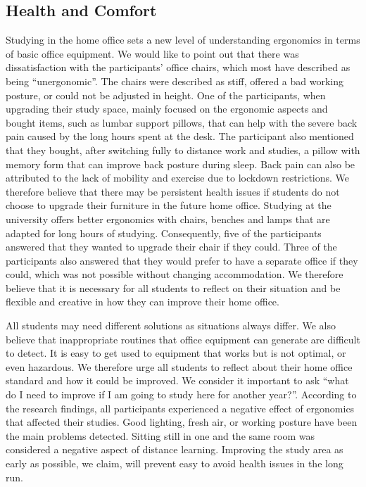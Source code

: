 \documentclass{sigchi}
\begin{document}
\subsection{Health and Comfort}
Studying in the home office sets a new level of understanding ergonomics in terms of basic office equipment. We would like to point out that there was dissatisfaction with the participants' office chairs, which most have described as being ``unergonomic''. The chairs were described as stiff, offered a bad working posture, or could not be adjusted in height. One of the participants, when upgrading their study space, mainly focused on the ergonomic aspects and bought items, such as lumbar support pillows, that can help with the severe back pain caused by the long hours spent at the desk. The participant also mentioned that they bought, after switching fully to distance work and studies, a pillow with memory form that can improve back posture during sleep. Back pain can also be attributed to the lack of mobility and exercise due to lockdown restrictions. We therefore believe that there may be persistent health issues if students do not choose to upgrade their furniture in the future home office. Studying at the university offers better ergonomics with chairs, benches and lamps that are adapted for long hours of studying. Consequently, five of the participants answered that they wanted to upgrade their chair if they could. Three of the participants also answered that they would prefer to have a separate office if they could, which was not possible without changing accommodation. We therefore believe that it is necessary for all students to reflect on their situation and be flexible and creative in how they can improve their home office. 

All students may need different solutions as situations always differ. We also believe that inappropriate routines that office equipment can generate are difficult to detect. It is easy to get used to equipment that works but is not optimal, or even hazardous. We therefore urge all students to reflect about their home office standard and how it could be improved. We consider it important to ask ``what do I need to improve if I am going to study here for another year?''. According to the research findings, all participants experienced a negative effect of ergonomics that affected their studies. Good lighting, fresh air, or working posture have been the main problems detected. Sitting still in one and the same room was considered a negative aspect of distance learning. Improving the study area as early as possible, we claim, will prevent easy to avoid health issues in the long run.
\end{document}
